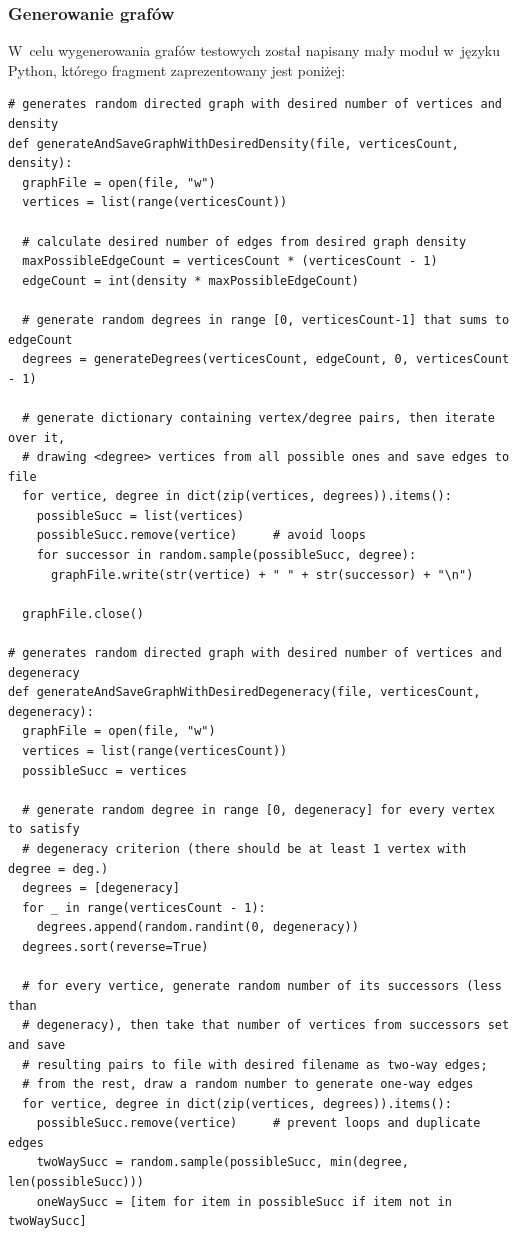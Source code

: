 \documentclass[11pt,a4paper]{article}
\begin{document}
\newpage
\subsubsection{Generowanie grafów}
W~celu wygenerowania grafów testowych został napisany mały moduł w~języku Python, którego fragment zaprezentowany jest poniżej:
\begin{lstlisting}[caption = Funkcje generujące grafy dla testów wydajnościowych]
# generates random directed graph with desired number of vertices and density
def generateAndSaveGraphWithDesiredDensity(file, verticesCount, density):
  graphFile = open(file, "w")
  vertices = list(range(verticesCount))

  # calculate desired number of edges from desired graph density
  maxPossibleEdgeCount = verticesCount * (verticesCount - 1)
  edgeCount = int(density * maxPossibleEdgeCount)

  # generate random degrees in range [0, verticesCount-1] that sums to edgeCount
  degrees = generateDegrees(verticesCount, edgeCount, 0, verticesCount - 1)

  # generate dictionary containing vertex/degree pairs, then iterate over it,
  # drawing <degree> vertices from all possible ones and save edges to file
  for vertice, degree in dict(zip(vertices, degrees)).items():
    possibleSucc = list(vertices)
    possibleSucc.remove(vertice)     # avoid loops
    for successor in random.sample(possibleSucc, degree):
      graphFile.write(str(vertice) + " " + str(successor) + "\n")

  graphFile.close()

# generates random directed graph with desired number of vertices and degeneracy
def generateAndSaveGraphWithDesiredDegeneracy(file, verticesCount, degeneracy):
  graphFile = open(file, "w")
  vertices = list(range(verticesCount))
  possibleSucc = vertices

  # generate random degree in range [0, degeneracy] for every vertex to satisfy
  # degeneracy criterion (there should be at least 1 vertex with degree = deg.)
  degrees = [degeneracy]
  for _ in range(verticesCount - 1):
    degrees.append(random.randint(0, degeneracy))
  degrees.sort(reverse=True)

  # for every vertice, generate random number of its successors (less than
  # degeneracy), then take that number of vertices from successors set and save
  # resulting pairs to file with desired filename as two-way edges;
  # from the rest, draw a random number to generate one-way edges
  for vertice, degree in dict(zip(vertices, degrees)).items():
    possibleSucc.remove(vertice)     # prevent loops and duplicate edges
    twoWaySucc = random.sample(possibleSucc, min(degree, len(possibleSucc)))
    oneWaySucc = [item for item in possibleSucc if item not in twoWaySucc]


\end{lstlisting}
\end{document}

